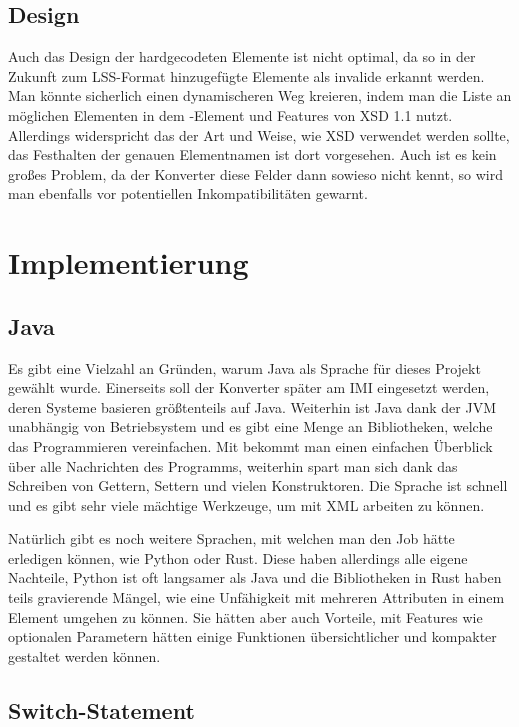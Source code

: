 \subsection{Design}

Auch das Design der hardgecodeten Elemente ist nicht optimal, da so in der Zukunft zum LSS-Format hinzugefügte Elemente als invalide erkannt werden.
Man könnte sicherlich einen dynamischeren Weg kreieren, indem man die Liste an möglichen Elementen in dem -Element und Features von XSD 1.1 nutzt.
Allerdings widerspricht das der Art und Weise, wie XSD verwendet werden sollte, das Festhalten der genauen Elementnamen ist dort vorgesehen.
Auch ist es kein großes Problem, da der Konverter diese Felder dann sowieso nicht kennt, so wird man ebenfalls vor potentiellen Inkompatibilitäten gewarnt.

\section{Implementierung}

\subsection{Java}

Es gibt eine Vielzahl an Gründen, warum Java als Sprache für dieses Projekt gewählt wurde.
Einerseits soll der Konverter später am IMI eingesetzt werden, deren Systeme basieren größtenteils auf Java.
Weiterhin ist Java dank der JVM unabhängig von Betriebsystem und es gibt eine Menge an Bibliotheken, welche das Programmieren vereinfachen.
Mit  bekommt man einen einfachen Überblick über alle Nachrichten des Programms, weiterhin spart man sich dank  das Schreiben von Gettern, Settern und vielen Konstruktoren.
Die Sprache ist schnell und es gibt sehr viele mächtige Werkzeuge, um mit XML arbeiten zu können.

Natürlich gibt es noch weitere Sprachen, mit welchen man den Job hätte erledigen können, wie Python oder Rust.
Diese haben allerdings alle eigene Nachteile, Python ist oft langsamer als Java und die Bibliotheken in Rust haben teils gravierende Mängel, wie eine Unfähigkeit mit mehreren Attributen in einem Element umgehen zu können.
Sie hätten aber auch Vorteile, mit Features wie optionalen Parametern hätten einige Funktionen übersichtlicher und kompakter gestaltet werden können.

\subsection{Switch-Statement}

